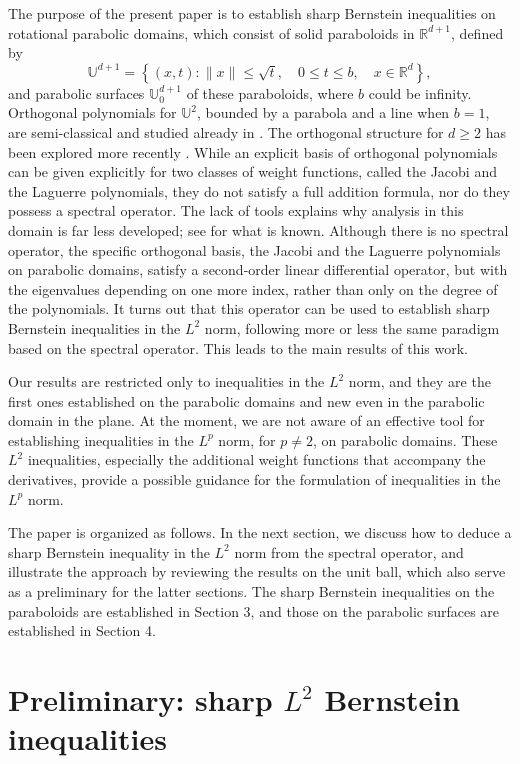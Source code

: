 \documentclass{amsart}
\theoremstyle{remark}
\def\RR{{\mathbb R}}
\def\UU{{\mathbb U}}
\begin{document}
The purpose of the present paper is to establish sharp Bernstein inequalities on rotational parabolic 
domains, which consist of solid paraboloids in $\RR^{d+1}$, defined by  
 $$
    \UU^{d+1} = \left \{(x,t): \|x\| \le \sqrt{t}, \quad 0 \le t \le b, \quad x \in \RR^d\right \},
 $$
and parabolic surfaces $\UU_0^{d+1}$ of these paraboloids, where $b$ could be infinity. Orthogonal
polynomials for $\UU^2$, bounded by a parabola and a line when $b=1$, are semi-classical and 
studied already in \cite{K75}. The orthogonal structure for $d \ge 2$ has been explored more recently 
\cite{X23a}. While an explicit basis of orthogonal polynomials can be given explicitly for two 
classes of weight functions, called the Jacobi and the Laguerre polynomials, they do not 
satisfy a full addition formula, nor do they possess a spectral operator.  The lack of tools explains why 
analysis in this domain is far less developed; see \cite{X23a} for what is known. Although there is no 
spectral operator, the specific orthogonal basis, the Jacobi and the Laguerre polynomials on parabolic 
domains, satisfy a second-order linear differential operator, but with the eigenvalues depending on 
one more index, rather than only on the degree of the polynomials. It turns out that this operator can 
be used to establish sharp Bernstein inequalities in the $L^2$ norm, following more or less the same 
paradigm based on the spectral operator. This leads to the main results of this work. 
 
Our results are restricted only to inequalities in the $L^2$ norm, and they are the first ones established 
on the parabolic domains and new even in the parabolic domain in the plane. At the moment, we are
not aware of an effective tool for establishing inequalities in the $L^p$ norm, for $p \ne 2$, on parabolic 
domains. These $L^2$ inequalities, especially the additional weight functions that accompany the derivatives, 
provide a possible guidance for the formulation of inequalities in the $L^p$ norm.   
 
The paper is organized as follows. In the next section, we discuss how to deduce a sharp Bernstein
inequality in the $L^2$ norm from the spectral operator, and illustrate the approach by reviewing the 
results on the unit ball, which also serve as a preliminary for the latter sections. The sharp Bernstein
inequalities on the paraboloids are established in Section 3, and those on the parabolic surfaces are
established in Section 4.    

\section{Preliminary: sharp $L^2$ Bernstein inequalities}
\setcounter{equation}{0}
\end{document}

